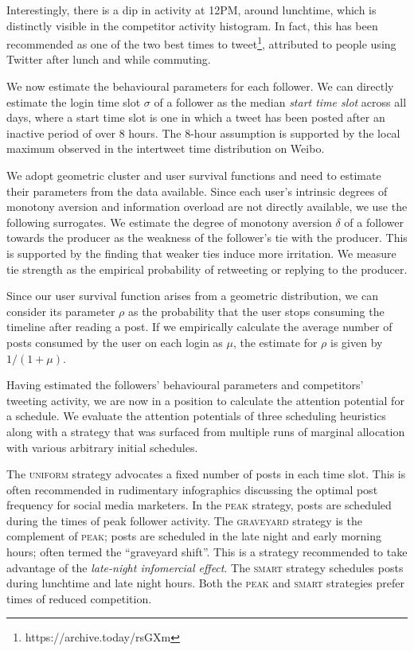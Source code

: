 \documentclass[onesided,letterpaper]{tufte-book}
\begin{document}
Interestingly, there is a dip in activity at 12PM, around lunchtime, which is distinctly visible in the competitor activity histogram. In fact, this has been recommended as one of the two best times to tweet\footnote{https://archive.today/rsGXm}, attributed to people using Twitter after lunch and while commuting.

We now estimate the behavioural parameters for each follower. We can directly estimate the login time slot $\sigma$ of a follower as the median \textit{start time slot} across all days, where a start time slot is one in which a tweet has been posted after an inactive period of over 8 hours. The 8-hour assumption is supported by the local maximum observed in the intertweet time distribution on Weibo.

We adopt geometric cluster and user survival functions and need to estimate their parameters from the data available. Since each user's intrinsic degrees of monotony aversion and information overload are not directly available, we use the following surrogates. We estimate the degree of monotony aversion $\delta$ of a follower towards the producer as the weakness of the follower's tie with the producer. This is supported by the finding that weaker ties induce more irritation\cite{koroleva2011cognition}. We measure tie strength as the empirical probability of retweeting or replying to the producer.

Since our user survival function arises from a geometric distribution, we can consider its parameter $\rho$ as the probability that the user stops consuming the timeline after reading a post. If we empirically calculate the average number of posts consumed by the user on each login as $\mu$, the estimate for $\rho$ is given by $1 / (1 + \mu)$.

Having estimated the followers' behavioural parameters and competitors' tweeting activity, we are now in a position to calculate the attention potential for a schedule. We evaluate the attention potentials of three scheduling heuristics along with a strategy that was surfaced from multiple runs of marginal allocation with various arbitrary initial schedules.

The \textsc{uniform} strategy advocates a fixed number of posts in each time slot. This is often recommended in rudimentary infographics discussing the optimal post frequency for social media marketers. In the \textsc{peak} strategy, posts are scheduled during the times of peak follower activity. The \textsc{graveyard} strategy is the complement of \textsc{peak}; posts are scheduled in the late night and early morning hours; often termed the ``graveyard shift''. This is a strategy recommended to take advantage of the \textit{late-night infomercial effect}\footnotemark[5]. The \textsc{smart} strategy schedules posts during lunchtime and late night hours. Both the \textsc{peak} and \textsc{smart} strategies prefer times of reduced competition.
\end{document}
